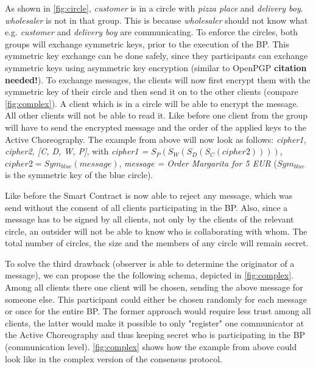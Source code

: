 \documentclass[runningheads]{llncs}
\begin{document}
As shown in \ref{fig:circle}, \textit{customer} is in a circle with \textit{pizza place} and \textit{delivery boy}. \textit{wholesaler} is not in that group. This is because \textit{wholesaler} should not know what e.g. \textit{customer} and \textit{delivery boy} are communicating. To enforce the circles, both groups will exchange symmetric keys, prior to the execution of the BP. This symmetric key exchange can be done safely, since they participants can exchange symmetric keys using asymmetric key encryption (similar to OpenPGP  \textbf{citation needed!}). To exchange messages, the clients will now first encrypt them with the symmetric key of their circle and then send it on to the other clients (compare \ref{fig:complex}). A client which is in a circle will be able to encrypt the message. All other clients will not be able to read it. Like before one client from the group will have to send the encrypted message and the order of the applied keys to the Active Choreography. The example from above will now look as follows: \textit{cipher1, cipher2, [C, D, W, P]}, with \textit{cipher1 =} $S_P(S_W(S_D(S_C(cipher2))))$, $cipher2 = Sym_{blue}(message)$, \textit{message = Order Margarita for 5 EUR} ($Sym_{blue}$ is the symmetric key of the blue circle).

Like before the Smart Contract is now able to reject any message, which was send without the consent of all clients participating in the BP. Also, since a message has to be signed by all clients, not only by the clients of the relevant circle, an outsider will not be able to know who is collaborating with whom. The total number of circles, the size and the members of any circle will remain secret. 

To solve the third drawback (observer is able to determine the originator of a message), we can propose the the following schema, depicted in \ref{fig:complex}. Among all clients there one client will be chosen, sending the above message for someone else. This participant could either be chosen randomly for each message or once for the entire BP. The former approach would require less trust among all clients, the latter would make it possible to only "register" one communicator at the Active Choreography and thus keeping secret who is participating in the BP (communication level). \ref{fig:complex} shows how the example from above could look like in the complex version of the consensus protocol.
\end{document}
